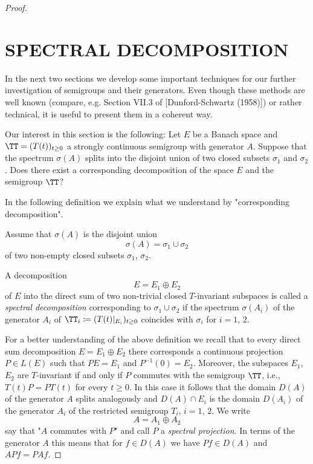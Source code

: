 \begin{proof}
\section{SPECTRAL DECOMPOSITION}\label{sec:a3-3}

In the next two sections we develop some important techniques for our further investigation of semigroups and their generators.
Even though these methods are well known (compare, e.g. Section VII.3 of [Dunford-Schwartz (1958)]) or rather technical, it is useful to present them in a coherent way.

Our interest in this section is the following: Let $E$ be a Banach space and $\TT = (T(t))_{t \geq 0}$ a strongly continuous semigroup with generator $A$.
Suppose that the spectrum $\sigma(A)$ splits into the disjoint union of two closed subsets $\sigma_{1}$ and $\sigma_{2}$.
Does there exist a corresponding decomposition of the space $E$ and the semigroup $\TT$?

In the following definition we explain what we understand by "corresponding decomposition".

\begin{definition}\label{def:a3-3.1}
	
	Assume that $\sigma(A)$ is the disjoint union
	\[
	\sigma(A) = \sigma_{1} \cup \sigma_{2}
	\]
	of two non-empty closed subsets $\sigma_{1}$, $\sigma_{2}$.
	
	A decomposition
	\[
	E = E_{1} \oplus E_{2}
	\]
	of $E$ into the direct sum of two non-trivial closed $T$-invariant subspaces is called a \emph{spectral decomposition} corresponding to $\sigma_{1} \cup \sigma_{2}$ if the spectrum $\sigma(A_{i})$ of the generator $A_{i}$ of $\TT_{i} \coloneqq (T(t)|_{E_{i}})_{t \geq 0}$ coincides with $\sigma_{i}$ for $i = 1$, $2$.
\end{definition}



\newpage

For a better understanding of the above definition we recall that to every direct sum decomposition $E = E_{1} \oplus E_{2}$ there corresponds a continuous projection $P \in L(E)$ such that $PE = E_{1}$ and $P^{-1}(0) = E_{2}$.
Moreover, the subspaces $E_{1}$, $E_{2}$ are $T$-invariant if and only if $P$ commutes with the semigroup $\TT$, i.e., $T(t)P = PT(t)$ for every $t \geq 0$.
In this case it follows that the domain $D(A)$ of the generator $A$ splits analogously and $D(A) \cap E_{i}$ is the domain $D(A_{i})$ of the generator $A_{i}$ of the restricted semigroup $T_{i}$, $i = 1$, $2$.
We write
\[
A = A_{1} \oplus A_{2}
\]
say that "$A$ commutes with $P$" and call $P$ a \emph{spectral projection}.
In terms of the generator $A$ this means that for $f \in D(A)$ we have $Pf \in D(A)$ and $APf = PAf$.


\end{proof}
